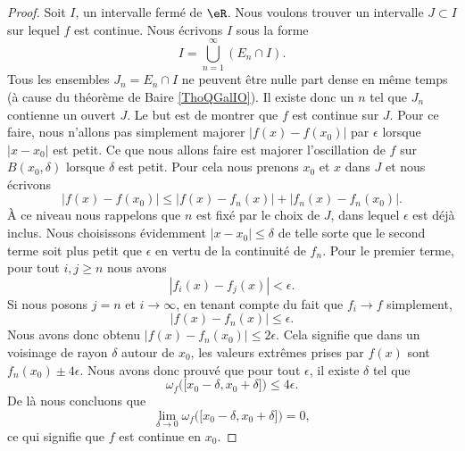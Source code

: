 \begin{proof}
    Soit \( I\), un intervalle fermé de \( \eR\). Nous voulons trouver un intervalle \( J\subset I\) sur lequel \( f\) est continue. Nous écrivons \( I\) sous la forme 
    \begin{equation}
        I=\bigcup_{n=1}^{\infty}(E_n\cap I).
    \end{equation}
    Tous les ensembles \( J_n=E_n\cap I\) ne peuvent être nulle part dense en même temps (à cause du théorème de Baire \ref{ThoQGalIO}). Il existe donc un \( n\) tel que \( J_n\) contienne un ouvert \( J\). Le but est de montrer que \( f\) est continue sur \( J\). Pour ce faire, nous n'allons pas simplement majorer \( | f(x)-f(x_0) |\) par \( \epsilon\) lorsque \( | x-x_0 |\) est petit. Ce que nous allons faire est majorer l'oscillation de \( f\) sur \( B(x_0,\delta)\) lorsque \( \delta\) est petit. Pour cela nous prenons \( x_0\) et \( x\) dans \( J\) et nous écrivons
    \begin{equation}
        | f(x)-f(x_0) |\leq | f(x)-f_n(x) |+| f_n(x)-f_n(x_0) |.
    \end{equation}
    À ce niveau nous rappelons que \( n\) est fixé par le choix de \( J\), dans lequel \( \epsilon\) est déjà inclus. Nous choisissons évidemment \( | x-x_0 |\leq \delta\) de telle sorte que le second terme soit plus petit que \( \epsilon\) en vertu de la continuité de \( f_n\). Pour le premier terme, pour tout \( i,j\geq n\) nous avons
    \begin{equation}
        | f_i(x)-f_j(x) |<\epsilon.
    \end{equation}
    Si nous posons \( j=n\) et \( i\to\infty\), en tenant compte du fait que \( f_i\to f\) simplement,
    \begin{equation}
        | f(x)-f_n(x) |\leq \epsilon.
    \end{equation}
    Nous avons donc obtenu \( | f(x)-f_n(x_0) |\leq 2\epsilon\). Cela signifie que dans un voisinage de rayon \( \delta\) autour de \( x_0\), les valeurs extrêmes prises par \( f(x) \) sont \( f_n(x_0)\pm 4\epsilon\). Nous avons donc prouvé que pour tout \( \epsilon\), il existe \( \delta\) tel que
    \begin{equation}
        \omega_f\big( \mathopen[ x_0-\delta , x_0+\delta \mathclose] \big)\leq 4\epsilon.
    \end{equation}
    De là nous concluons que
    \begin{equation}
        \lim_{\delta\to 0}\omega_f\big( \mathopen[ x_0-\delta , x_0+\delta \mathclose] \big)=0,
    \end{equation}
    ce qui signifie que \( f\) est continue en \( x_0\).
\end{proof}


